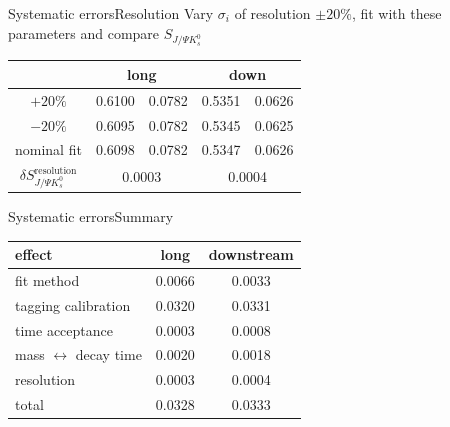 \documentclass{beamer}
\newcommand{\SJPsi}{S_{J/\Psi K_s^0}}
\begin{document}
\begin{frame}{Systematic errors}{Resolution}
Vary $\sigma_i$ of resolution $\pm 20\%$, fit with these parameters and compare $\SJPsi$
\begin{center}
\begin{tabular}{c r@{$\pm$}l r@{$\pm$}l}
\hline \hline
 & \multicolumn{2}{c}{long} & \multicolumn{2}{c}{down} \\ \hline
$+20\%$ &0.6100 & 0.0782& 0.5351 & 0.0626 \\
$-20\%$ & 0.6095 & 0.0782 & 0.5345 & 0.0625 \\ \hline
nominal fit & 0.6098 & 0.0782 & 0.5347 & 0.0626 \\ \hline
$\delta\SJPsi^{\text{resolution}}$ & \multicolumn{2}{c}{0.0003} & \multicolumn{2}{c}{0.0004} \\
\hline \hline
\end{tabular}
\end{center}
\end{frame}


\begin{frame}{Systematic errors}{Summary}
\begin{center}
\begin{tabular}{l c c}
\hline \hline
effect & long & downstream \\ \hline
fit  method & 0.0066 & 0.0033\\
tagging calibration & 0.0320 & 0.0331\\
time acceptance & 0.0003 & 0.0008\\
mass $\leftrightarrow$ decay time & 0.0020 & 0.0018 \\
resolution & 0.0003 & 0.0004 \\ \hline
total & 0.0328 & 0.0333 \\
\hline \hline
\end{tabular}
\end{center}
\end{frame}
\end{document}
